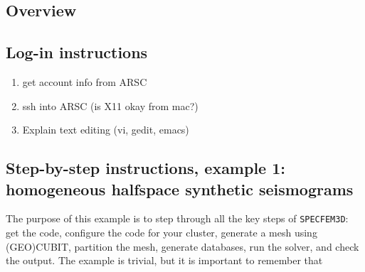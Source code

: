 \documentclass[10pt,fleqn,letterpaper]{article}
\title{\thetitle}
\author{\theauthor}
\date{Last compiled: \today}
\begin{document}

\maketitle



\subsection*{Overview}


\subsection*{Log-in instructions}

\begin{enumerate}
\item get account info from ARSC
\item ssh into ARSC (is X11 okay from mac?)
\item Explain text editing (vi, gedit, emacs)
\end{enumerate}


\subsection*{Step-by-step instructions, example 1: homogeneous halfspace synthetic seismograms}

The purpose of this example is to step through all the key steps of \verb+SPECFEM3D+: get the code, configure the code for your cluster, generate a mesh using (GEO)CUBIT, partition the mesh, generate databases, run the solver, and check the output. The example is trivial, but it is important to remember that 
\end{document}
